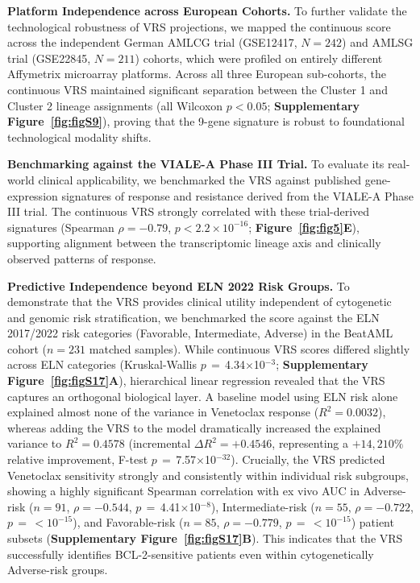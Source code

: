 \documentclass[11pt,a4paper]{article}
\newcommand{\pval}[1]{$p$\,$=$\,#1}
\begin{document}
\textbf{Platform Independence across European Cohorts.} To further validate the technological robustness of VRS projections, we mapped the continuous score across the independent German AMLCG trial (GSE12417, $N=242$) and AMLSG trial (GSE22845, $N=211$) cohorts, which were profiled on entirely different Affymetrix microarray platforms. Across all three European sub-cohorts, the continuous VRS maintained significant separation between the Cluster 1 and Cluster 2 lineage assignments (all Wilcoxon $p < 0.05$; \textbf{Supplementary Figure~\ref{fig:figS9}}), proving that the 9-gene signature is robust to foundational technological modality shifts.

\textbf{Benchmarking against the VIALE-A Phase III Trial.} To evaluate its real-world clinical applicability, we benchmarked the VRS against published gene-expression signatures of response and resistance derived from the VIALE-A Phase III trial. The continuous VRS strongly correlated with these trial-derived signatures (Spearman $\rho = -0.79$, $p < 2.2 \times 10^{-16}$; \textbf{Figure~\ref{fig:fig5}E}), supporting alignment between the transcriptomic lineage axis and clinically observed patterns of response.

\textbf{Predictive Independence beyond ELN 2022 Risk Groups.} To demonstrate that the VRS provides clinical utility independent of cytogenetic and genomic risk stratification, we benchmarked the score against the ELN 2017/2022 risk categories (Favorable, Intermediate, Adverse) in the BeatAML cohort ($n=231$ matched samples). While continuous VRS scores differed slightly across ELN categories (Kruskal-Wallis \pval{4.34$\times$10$^{-3}$}; \textbf{Supplementary Figure~\ref{fig:figS17}A}), hierarchical linear regression revealed that the VRS captures an orthogonal biological layer. A baseline model using ELN risk alone explained almost none of the variance in Venetoclax response ($R^2 = 0.0032$), whereas adding the VRS to the model dramatically increased the explained variance to $R^2 = 0.4578$ (incremental $\Delta R^2 = +0.4546$, representing a $+14{,}210\%$ relative improvement, F-test \pval{7.57$\times$10$^{-32}$}). Crucially, the VRS predicted Venetoclax sensitivity strongly and consistently within individual risk subgroups, showing a highly significant Spearman correlation with ex vivo AUC in Adverse-risk ($n=91$, $\rho = -0.544$, \pval{4.41$\times$10$^{-8}$}), Intermediate-risk ($n=55$, $\rho = -0.722$, \pval{$< 10^{-15}$}), and Favorable-risk ($n=85$, $\rho = -0.779$, \pval{$< 10^{-15}$}) patient subsets (\textbf{Supplementary Figure~\ref{fig:figS17}B}). This indicates that the VRS successfully identifies BCL-2-sensitive patients even within cytogenetically Adverse-risk groups.
\end{document}
